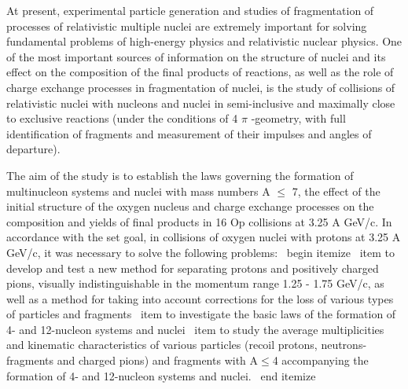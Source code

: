 \documentclass[fontsize=14pt]{scrarticle}
\begin{document}
   At present, experimental particle generation and studies of fragmentation of processes of relativistic multiple nuclei are extremely important for solving fundamental problems of high-energy physics and relativistic nuclear physics. One of the most important sources of information on the structure of nuclei and its effect on the composition of the final products of reactions, as well as the role of charge exchange processes in fragmentation of nuclei, is the study of collisions of relativistic nuclei with nucleons and nuclei in semi-inclusive and maximally close to exclusive reactions (under the conditions of 4 $ \pi$ -geometry, with full identification of fragments and measurement of their impulses and angles of departure).
   
   The aim of the study is to establish the laws governing the formation of multinucleon systems and nuclei with mass numbers A $\le$ 7, the effect of the initial structure of the oxygen nucleus and charge exchange processes on the composition and yields of final products in 16 Op collisions at 3.25 A GeV/c. In accordance with the set goal, in collisions of oxygen nuclei with protons at 3.25 A GeV/c, it was necessary to solve the following problems:
\ begin {itemize}
    \ item to develop and test a new method for separating protons and positively charged pions, visually indistinguishable in the momentum range 1.25 - 1.75 GeV/c, as well as a method for taking into account corrections for the loss of various types of particles and fragments
    \ item to investigate the basic laws of the formation of 4- and 12-nucleon systems and nuclei
    \ item to study the average multiplicities and kinematic characteristics of various particles (recoil protons, neutrons-fragments and charged pions) and fragments with A$\le$4 accompanying the formation of 4- and 12-nucleon systems and nuclei.
    \ end {itemize}



	\newpage	
	\tableofcontents
	\setcounter{page}{3}
	\newpage
	
\end{document}
